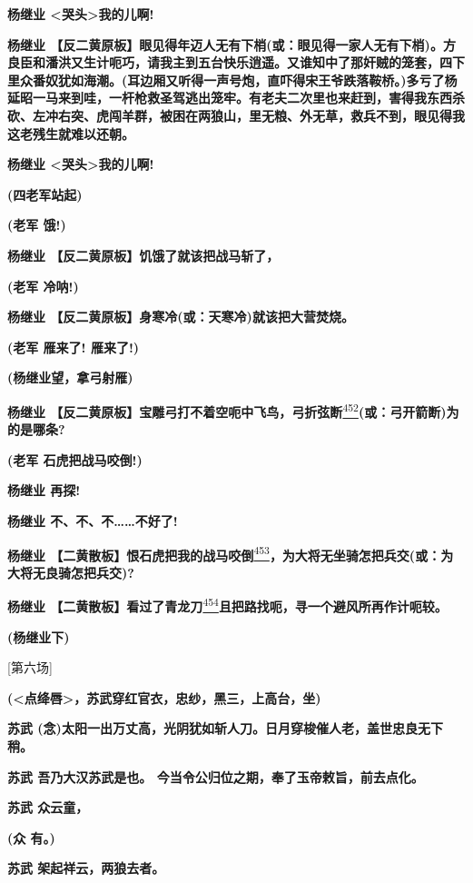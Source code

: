 \textbf{杨继业 \textless{}哭头\textgreater{}我的儿啊!}

\textbf{杨继业
【反二黄原板】眼见得年迈人无有下梢(或：眼见得一家人无有下梢)。方良臣和潘洪又生计呃巧，请我主到五台快乐逍遥。又谁知中了那奸贼的笼套，四下里众番奴犹如海潮。(耳边厢又听得一声号炮，直吓得宋王爷跌落鞍桥。)多亏了杨延昭一马来到哇，一杆枪救圣驾逃出笼牢。有老夫二次里也来赶到，害得我东西杀砍、左冲右突、虎闯羊群，被困在两狼山，里无粮、外无草，救兵不到，眼见得我这老残生就难以还朝。}

\textbf{杨继业 \textless{}哭头\textgreater{}我的儿啊!}

\textbf{(四老军站起)}

\textbf{(老军 饿!)}

\textbf{杨继业 【反二黄原板】饥饿了就该把战马斩了，}

\textbf{(老军 冷呐!)}

\textbf{杨继业 【反二黄原板】身寒冷(或：天寒冷)就该把大营焚烧。}

\textbf{(老军 雁来了! 雁来了!)}

\textbf{(杨继业望，拿弓射雁)}

\textbf{杨继业
【反二黄原板】宝雕弓打不着空呃中飞鸟，弓折弦断}\protect\hyperlink{fn452}{\textsuperscript{452}}\textbf{(或：弓开箭断)为的是哪条?}

\textbf{(老军 石虎把战马咬倒!)}

\textbf{杨继业 再探!}

\textbf{杨继业 不、不、不\ldots{}\ldots{}不好了!}

\textbf{杨继业
【二黄散板】恨石虎把我的战马咬倒}\protect\hyperlink{fn453}{\textsuperscript{453}}\textbf{，为大将无坐骑怎把兵交(或：为大将无良骑怎把兵交)?}

\textbf{杨继业
【二黄散板】看过了青龙刀}\protect\hyperlink{fn454}{\textsuperscript{454}}\textbf{且把路找呃，寻一个避风所再作计呃较。}

\textbf{(杨继业下)}

{[}第六场{]}

\textbf{(\textless{}点绛唇\textgreater{}，苏武穿红官衣，忠纱，黑三，上高台，坐)}

\textbf{苏武
(念)太阳一出万丈高，光阴犹如斩人刀。日月穿梭催人老，盖世忠良无下稍。}

\textbf{苏武 吾乃大汉苏武是也。
今当令公归位之期，奉了玉帝敕旨，前去点化。}

\textbf{苏武 众云童，}

\textbf{(众 有。)}

\textbf{苏武 架起祥云，两狼去者。}

